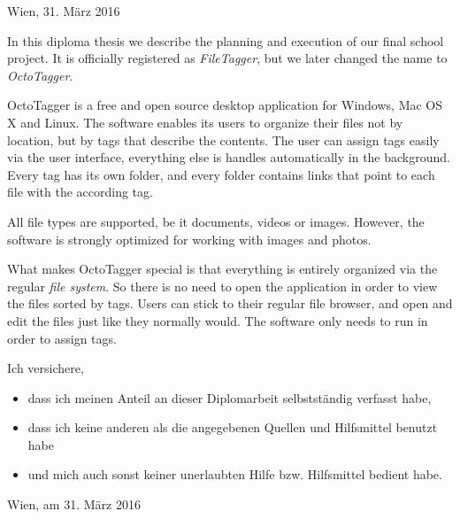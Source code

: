 \documentclass[12pt,a4paper,english,oneside,openright,DIV=12,BCOR=1cm]{scrbook}
\begin{document}
\begin{titlepage}
\begin{center}
\vspace{5mm}
Wien, 31. März 2016
\par\end{center}

\end{titlepage}%


\thispagestyle{fancy}
In this diploma thesis we describe the planning and execution of our final
school project. It is officially registered as \textit{FileTagger}, but we later changed the name to \textit{OctoTagger}.

OctoTagger is a free and open source desktop application for Windows, Mac OS X and Linux. The
software enables its users to organize their files not by location, but by tags
that describe the contents. The user can assign tags easily via the user
interface, everything else is handles automatically in the background. Every tag has its own folder, and every folder contains links that point to each file with
the according tag.

All file types are supported, be it documents, videos or images. However,
the software is strongly optimized for working with images and photos.

What makes OctoTagger special is that everything is entirely organized via the regular \emph{file system}. So there is no need to open the
application in order to view the files sorted by tags. Users can stick to their regular file browser, and open and edit the files just like they normally would. The software only needs to run in order to assign tags.


\thispagestyle{fancy}

Ich versichere,
\begin{itemize}
\item dass ich meinen Anteil an dieser Diplomarbeit selbstständig verfasst
habe,
\item dass ich keine anderen als die angegebenen Quellen und Hilfsmittel
benutzt habe
\item und mich auch sonst keiner unerlaubten Hilfe bzw. Hilfsmittel bedient
habe.
\end{itemize}
\bigskip{}
Wien, am 31. März 2016 %
\end{document}
